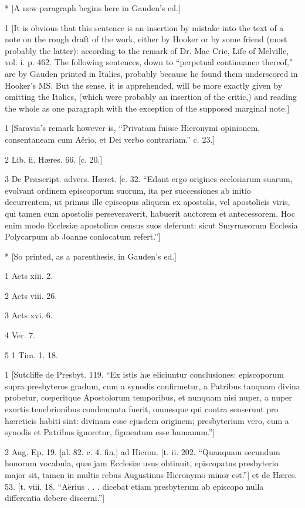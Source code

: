 *
[A new paragraph begins here in Gauden’s ed.]

1
[It is obvious that this sentence is an insertion by mistake into the text of a note on the rough draft of the work, either by Hooker or by some friend (most probably the latter): according to the remark of Dr. Mac Crie, Life of Melville, vol. i. p. 462. The following sentences, down to “perpetual continuance thereof,” are by Gauden printed in Italics, probably because he found them underscored in Hooker’s MS. But the sense, it is apprehended, will be more exactly given by omitting the Italics, (which were probably an insertion of the critic,) and reading the whole as one paragraph with the exception of the supposed marginal note.]

1
[Saravia’s remark however is, “Privatam fuisse Hieronymi opinionem, consentaneam cum Aërio, et Dei verbo contrariam.” c. 23.]

2
Lib. ii. Hæres. 66. [c. 20.]

3
De Præscript. advers. Hæret. [c. 32. “Edant ergo origines ecclesiarum suarum, evolvant ordinem episcoporum suorum, ita per successiones ab initio decurrentem, ut primus ille episcopus aliquem ex apostolis, vel apostolicis viris, qui tamen cum apostolis perseveraverit, habuerit auctorem et antecessorem. Hoc enim modo Ecclesiæ apostolicæ census suos deferunt: sicut Smyrnæorum Ecclesia Polycarpum ab Joanne conlocatum refert.”]

*
[So printed, as a parenthesis, in Gauden’s ed.]

1
Acts xiii. 2.

2
Acts viii. 26.

3
Acts xvi. 6.

4
Ver. 7.

5
1 Tim. 1. 18.

1
[Sutcliffe de Presbyt. 119. “Ex istis hæ eliciuntur conclusiones: episcoporum supra presbyteros gradum, cum a synodis confirmetur, a Patribus tanquam divina probetur, cœperitque Apostolorum temporibus, et nunquam nisi nuper, a nuper exortis tenebrionibus condemnata fuerit, omnesque qui contra senserunt pro hæreticis habiti sint: divinam esse ejusdem originem; presbyterium vero, cum a synodis et Patribus ignoretur, figmentum esse humanum.”]

2
Aug. Ep. 19. [al. 82. c. 4. fin.] ad Hieron. [t. ii. 202. “Quanquam secundum honorum vocabula, quæ jam Ecclesiæ usus obtinuit, episcopatus presbyterio major sit, tamen in multis rebus Augustinus Hieronymo minor est.”] et de Hæres. 53. [t. viii. 18. “Aërius . . . dicebat etiam presbyterum ab episcopo nulla differentia debere discerni.”]

